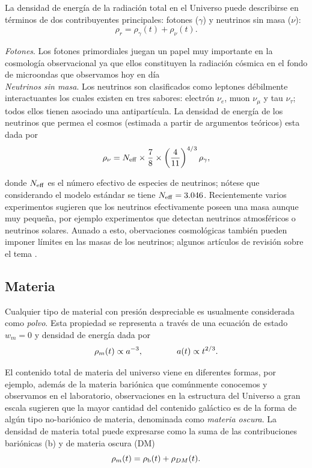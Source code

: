\documentclass[10.5pt,prb,
               showpacs,            %
               preprintnumbers,     %
               aps,                 %
               prl,          	    %
               letterpaper,             %
               superscriptaddress,      %
               nofootinbib,         %
               tightenlines,        %
               floats,floatfix      %
               ,usenatbib]{revtex4-1}%
\def\beq{\begin{equation}}
\def\eeq{\end{equation}}
\begin{document}
\noindent
La densidad de energ\'ia de la radiaci\'on total en el Universo puede describirse en t\'erminos
de dos contribuyentes principales: fotones ($\gamma$) y neutrinos sin masa ($\nu$):
%
	\beq
		\rho_r = \rho_\gamma(t) + \rho_\nu(t).
	\eeq

\textit{Fotones}. Los fotones primordiales juegan un papel muy importante en la cosmolog\'ia 
observacional  ya que ellos constituyen la radiaci\'on c\'osmica en el fondo de microondas que observamos
hoy en d\'ia \citet{COBE}
\\

\textit{Neutrinos sin masa}. Los neutrinos son clasificados como leptones d\'ebilmente interactuantes los cuales existen
en tres sabores: electr\'on $\nu_e$, muon $\nu_\mu$ y tau $\nu_\tau$; todos ellos tienen asociado una antipart\'icula. 
La densidad de energ\'ia  de los neutrinos que permea el cosmos (estimada a partir de argumentos te\'oricos) esta
dada por 
%
	\beq \label{eq:nu}
		\rho_\nu = N_{\rm eff} \times \frac{7}{8}\times \left(\frac{4}{11} \right)^{4/3}\rho_\gamma,
	\eeq

\noindent
donde $N_{\rm eff}$ es el n\'umero efectivo de especies de neutrinos; n\'otese que considerando el modelo est\'andar se tiene $N_{\rm eff}=3.046$.
Recientemente varios experimentos sugieren que los neutrinos efectivamente poseen 
una masa aunque muy peque\~na, por ejemplo experimentos que detectan neutrinos atmosf\'ericos o neutrinos solares.
Aunado a esto, obervaciones cosmol\'ogicas tambi\'en pueden imponer l\'imites en las masas de los neutrinos; algunos art\'iculos
de revisi\'on sobre el tema \cite{neutrinos}.


\subsection*{Materia}

Cualquier tipo de material con presi\'on despreciable es usualmente considerada como \textit{polvo}. 
Esta propiedad se representa a trav\'es de una ecuaci\'on de estado $w_m=0$ y densidad de energ\'ia dada por
%
	\beq
		\rho_m(t) \propto a^{-3}, \qquad {\rm} \qquad a(t)\propto t^{2/3}.
	\eeq
	
\noindent
El contenido total de materia del universo viene en diferentes formas,  por ejemplo, adem\'as de la materia bari\'onica que 
com\'unmente conocemos y observamos en el laboratorio, observaciones en la estructura del Universo a gran escala 
sugieren que la mayor cantidad del contenido gal\'actico es de la forma de alg\'un tipo no-bari\'onico de materia, denominada 
como \textit{materia oscura}. 
La densidad de materia total puede expresarse como la suma de las contribuciones bari\'onicas (b)
y de materia oscura (DM)
%
	\beq
		\rho_m(t) = \rho_{\rm b}(t) + \rho_{DM}(t).
	\eeq
\end{document}
